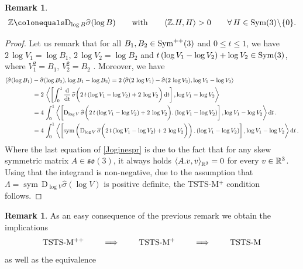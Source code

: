 \documentclass[10pt]{article}
\newcounter{theoremCounter}
\numberwithin{theoremCounter}{section}
\theoremstyle{plain}
\theoremstyle{definition}
\newtheorem{rem}[theoremCounter]{Remark}
\newcommand{\DD}{\mathrm{D}}
\newcommand*\dif{\mathop{}\!\mathrm{d}}
\DeclareMathOperator{\Sym}{Sym}
\DeclareMathOperator{\sym}{sym}
\numberwithin{equation}{section}
\newcommand{\scal}[2]{\left\langle#1,#2\right\rangle}
\begin{document}
\begin{appendix}
\begin{rem}
\begin{align}
	\mathbb{Z} \colonequals \DD_{\log B} \widehat \sigma(\log B) \qquad \textnormal{with} \qquad \langle \mathbb{Z}. H, H \rangle > 0 \qquad \forall \, H \in \Sym(3) \! \setminus \! \{0\}.
	\end{align}
\end{rem}
\begin{proof}
Let us remark that for all $B_1, B_2\in {\rm Sym}^{++}(3)$ and $0\leq t\leq 1$, we have $2\,\log V_1=\log B_1, \, 2\,\log V_2=\log B_2$ and $t\, (\log
V_1-\log V_2)+\log V_2\in{\rm Sym}(3)$, where $V_1^2=B_1,\, V_2^2=B_2$ . Moreover, we have
	 \begin{align}\label{Joginespr}
	  \langle \widehat \sigma(\log B_1)&- \widehat \sigma(\log B_2),\log B_1-\log B_2\rangle=2\,\langle \widehat \sigma(2\,\log V_1)- \widehat \sigma(2\,\log V_2),\log V_1-\log
	  V_2\rangle\notag\\&=2\,\left\langle\left[\int_0^1 \frac{\rm d}{\rm dt}\, \widehat \sigma \bigg(2\,t\, (\log V_1-\log V_2)+2\,\log V_2\bigg) \dif t\right],\log V_1-\log
	  V_2\right\rangle\\&=4\,\int_0^1 \left\langle\left[\DD_{\log V}\, \widehat \sigma \bigg(2\,t\, (\log V_1-\log V_2)+2\,\log V_2\bigg).\,(\log V_1-\log V_2)\right],\log
	  V_1-\log V_2\right\rangle \dif t\,.\notag \\
	  &= 4\,\int_0^1 \left\langle\left[\sym \left( \DD_{\log V}\, \widehat \sigma \bigg(2\,t\, (\log V_1-\log V_2)+2\,\log V_2\bigg) \right) .\,(\log V_1-\log V_2)\right],\log
	  V_1-\log V_2\right\rangle \dif t\,.\notag
	 \end{align}
Where the last equation of \eqref{Joginespr} is due to the fact that 
for any skew symmetric matrix $A\in\mathfrak{so}(3)$, it always holds
$
\scal{A.v}{v}_{\bR^{3}}
=0
$
for every $v\in\mathbb{R}^3$. Using that the integrand is non-negative, due to the assumption that $\Lambda = \sym \, \DD_{\log V} \widehat \sigma(\log V)$ is positive definite, the TSTS-M$^+$ condition
 follows.
\end{proof}
%
\begin{rem}
As an easy consequence of the previous remark we obtain the implications
	\begin{align}
	\textnormal{TSTS-M$^{++}$} \qquad \implies \qquad \textnormal{TSTS-M$^{+}$} \qquad \implies \qquad \textnormal{TSTS-M}
	\end{align}
as well as the equivalence \quad 
\end{rem}
%

\end{appendix}
\end{document}

